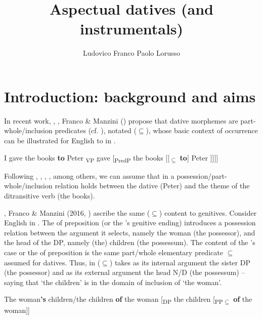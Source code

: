 \documentclass[output=paper,modfonts,nonflat,newtxmath,colorlinks,citecolor=brown]{langsci/langscibook}
\author{Ludovico Franco\affiliation{Università di Firenze}\lastand 
Paolo Lorusso\affiliation{Istituto Universitario Studi Superiori (IUSS) Pavia }}
\title{Aspectual datives (and instrumentals)}
\begin{document}
\maketitle



\section{Introduction: background and aims}
\label{sec:franco:1}

In recent work, \citet{ManziniSavoia2011}, \citet{ManziniFranco2016}, Franco \& Manzini (\citeyear{FrancoManzini2017Gen, FrancoManzini2017Ins}) propose that dative morphemes are part-whole/inclusion predicates (cf.  \citealt{BelvinDenDikken1997}), notated (${\subseteq}$), whose basic context of occurrence can be illustrated for English {to} in .

\ea%
    \label{ex:franco:1}
    \ea I gave the books \textbf{to} Peter
   \ex  {[}\textsubscript{VP} gave [\textsubscript{PredP} the books [[\textsubscript{${\subseteq}$} \textbf{to}] Peter ]{]]]}
   \z
    \z

Following \citet{Kayne1984}, \citet{Pesetsky1995}, \citet{BeckJohnson2004}, \citet{Harley2002}, among others, we can assume that in  a possession/part-whole/inclusion relation holds between the dative ({Peter}) and the theme of the ditransitive verb ({the books}). 

\citet{ManziniSavoia2011}, Franco \& Manzini (2016, \citeyear{FrancoManzini2017Gen}) ascribe the same (${\subseteq}$) content to genitives. Consider English in . The {of} preposition (or the {’s} genitive ending) introduces a possession relation between the argument it selects, namely {the woman} (the possessor), and the head of the DP, namely ({the}) {children} (the possessum). The content of the {’s} case or the {of} preposition is the same part/whole elementary predicate ${\subseteq}$ assumed for datives. Thus, in  (${\subseteq}$) takes as its internal argument the sister DP (the possessor) and as its external argument the head N/D (the possessum) – saying that ‘the children’ is in the domain of inclusion of ‘the woman’. 

\ea%
    \label{ex:franco:2}
    \ea \label{ex:franco:2a}The woman\textbf{’s} children/the children \textbf{of} the woman
    \ex \label{ex:franco:2b}{[}\textsubscript{DP} the children [\textsubscript{PP${\subseteq}$} \textbf{of} the woman{]]} 
    \z
    \z
\end{document}
